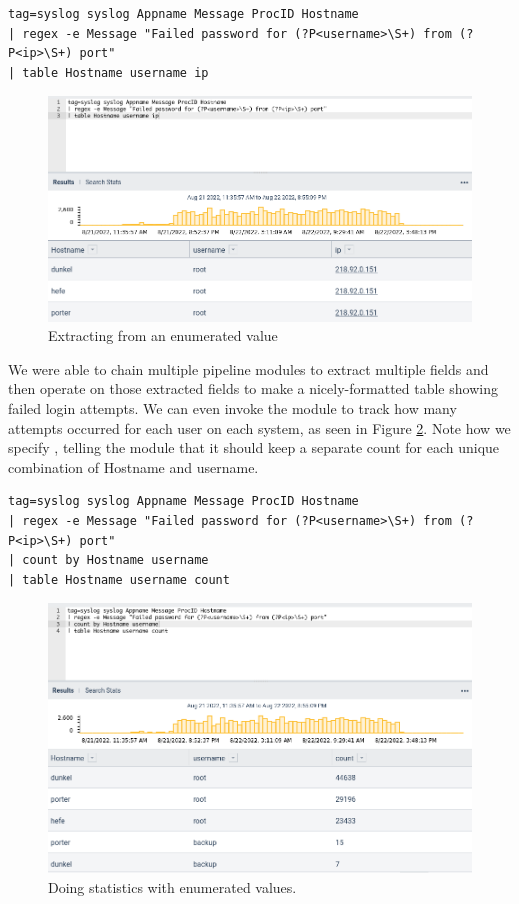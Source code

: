 \begin{Verbatim}[breaklines=true]
tag=syslog syslog Appname Message ProcID Hostname 
| regex -e Message "Failed password for (?P<username>\S+) from (?P<ip>\S+) port"
| table Hostname username ip
\end{Verbatim}

\begin{figure}
	\includegraphics[width=0.8\linewidth]{images/extract-ev.png}
	\caption{Extracting from an enumerated value}
	\label{fig:extract-ev}
\end{figure}

We were able to chain multiple pipeline modules to extract multiple
fields and then operate on those extracted fields to make a nicely-formatted table
showing failed login attempts. We can even invoke the  module to track how
many attempts occurred for each user on each system, as seen in Figure \ref{fig:extract-count}.
Note how we specify , telling the  module that it
should keep a separate count for each unique combination of Hostname and username.

\begin{Verbatim}
tag=syslog syslog Appname Message ProcID Hostname 
| regex -e Message "Failed password for (?P<username>\S+) from (?P<ip>\S+) port"
| count by Hostname username
| table Hostname username count
\end{Verbatim}

\begin{figure}
	\includegraphics[width=0.8\linewidth]{images/extract-count.png}
	\caption{Doing statistics with enumerated values.}
	\label{fig:extract-count}
\end{figure}

